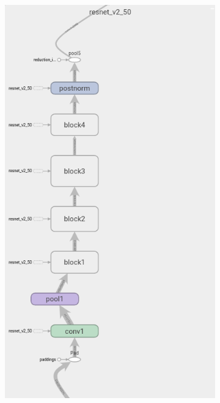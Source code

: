 \begin{figure}[h]
	\begin{subfigure}[h]{0.45\textwidth}
		\centering
		\includegraphics[width=\textwidth]{images/chapter3/resnet_v2_50.png}
	\end{subfigure} 
	\hfill
	\begin{subfigure}[h]{0.45\textwidth}

\end{subfigure}
\end{figure}

